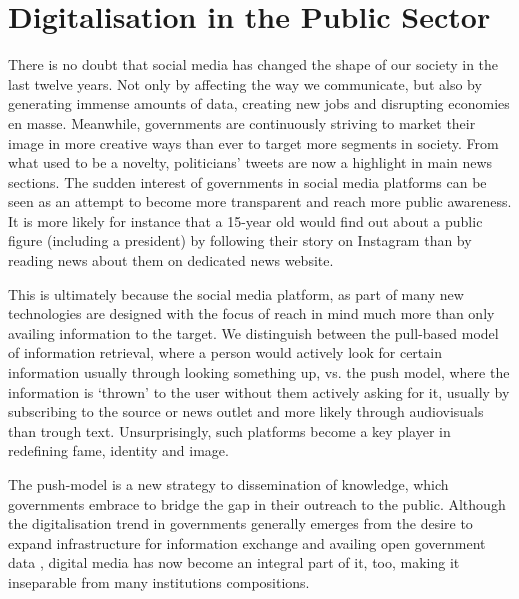 \section{Digitalisation in the Public Sector}

There is no doubt that social media has changed the shape of our society in the last twelve years. Not only by affecting the way we communicate, but also by generating immense amounts of data, creating new jobs and disrupting economies en masse.
Meanwhile, governments are continuously striving to market their image in more creative ways than ever to target more segments in society. From what used to be a novelty, politicians' tweets are now a highlight in main news sections. The sudden interest of governments in social media platforms 
can be seen as an attempt to become more transparent and reach more public awareness. It is more likely for instance that a 15-year old would find out about a public figure (including a president) by following their story on Instagram than by reading news about them on dedicated news website.

This is ultimately because the social media platform, as part of many new technologies are designed with the focus of reach in mind much more than only availing information to the target.
We distinguish between the pull-based model of information retrieval, where a person would actively look for certain information usually through looking something up, vs. the push model, where the information is `thrown' to the user without them actively asking for it, usually by subscribing to the source or news outlet and more likely through audiovisuals than trough text. Unsurprisingly, such platforms become a key player in redefining fame, identity and image.

The push-model is a new strategy to dissemination of knowledge, which governments %
embrace \cite{forbes:govOutreach} to bridge the gap in their outreach to the public. 
Although the digitalisation trend in governments generally emerges from the desire to expand infrastructure for information exchange and availing open government data \cite{un:egovReport}, digital media has now become an integral part of it, too, making it inseparable from many institutions compositions. 

